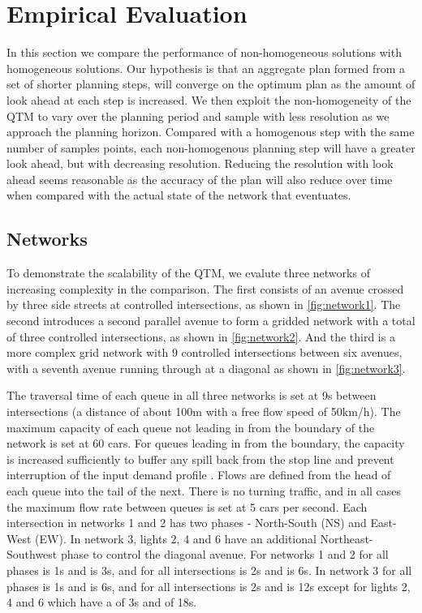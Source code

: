 
\section{Empirical Evaluation}

  
In this section we compare the performance of non-homogeneous solutions with homogeneous solutions. Our hypothesis is that an aggregate plan formed from a set of shorter planning steps, will converge on the optimum plan as the amount of look ahead at each step is increased. We then exploit the non-homogeneity of the QTM to vary \DT[] over the planning period and sample with less resolution as we approach the planning horizon. Compared with a homogenous step with the same number of samples points, each non-homogenous planning step will have a greater look ahead, but with decreasing resolution. Reducing the resolution with look ahead seems reasonable as the accuracy of the plan will also reduce over time when compared with the actual state of the network that eventuates.


\subsection{Networks}

To demonstrate the scalability of the QTM, we evalute three networks of increasing complexity
in the comparison. The first consists of an avenue crossed by three 
side streets at controlled intersections, as shown in \cref{fig:network1}. The second introduces a second
parallel avenue to form a gridded network with a total of three controlled
intersections, as shown in \cref{fig:network2}. And the third is a more complex
grid network with 9 controlled intersections between six avenues, with a seventh avenue running through at a diagonal as shown in \cref{fig:network3}.

The traversal time of each queue in all three networks is set at 9s 
between intersections (a distance of about 100m with a free flow speed of
50km/h). The maximum capacity of each queue not leading in from the boundary of the network
is set at 60 cars. For queues leading in from the boundary, the capacity is increased sufficiently
to buffer any spill back from the stop line and prevent interruption of the input demand profile .
Flows are defined from the head of each queue into the
tail of the next. There is no turning traffic, and in all cases the
maximum flow rate between queues is set at 5 cars per second. Each intersection in networks 1 and 2 has
two phases - North-South (NS) and East-West (EW). In network 3, lights 2, 4 and 6 have an
additional Northeast-Southwest phase to control the diagonal avenue. For networks 1 and 2 for all phases \PTMIN{}{} is 1s
and \PTMAX{}{} is 3s, and for all intersections \CTMIN{}{} is 2s and \CTMAX{}{} is 6s. In network 3 for all phases \PTMIN{}{} is 1s
and \PTMAX{}{} is 6s, and for all intersections \CTMIN{}{} is 2s and \CTMAX{}{} is 12s except for lights 2, 4 and 6 which have a \CTMIN{}{} of 3s and \CTMAX{}{} of 18s.


